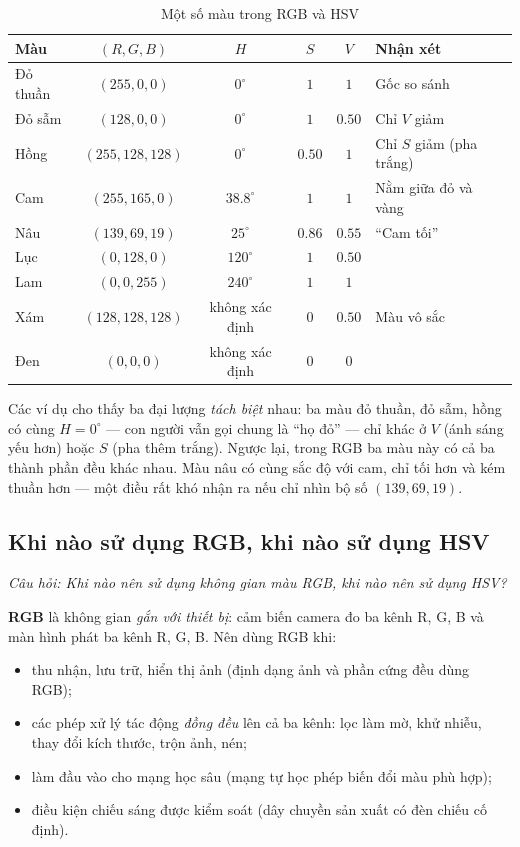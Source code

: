 \begin{table}[ht]
\centering
\small
\caption{Một số màu trong RGB và HSV}
\label{tab:w4_hsv_examples}
\renewcommand{\arraystretch}{1.25}
\begin{tabular}{|l|c|c|c|c|l|}
\hline
\textbf{Màu} & \textbf{$(R, G, B)$} & \textbf{$H$} & \textbf{$S$} & \textbf{$V$} & \textbf{Nhận xét} \\
\hline
Đỏ thuần & $(255, 0, 0)$ & $0^\circ$ & $1$ & $1$ & Gốc so sánh \\
Đỏ sẫm & $(128, 0, 0)$ & $0^\circ$ & $1$ & $0.50$ & Chỉ $V$ giảm \\
Hồng & $(255, 128, 128)$ & $0^\circ$ & $0.50$ & $1$ & Chỉ $S$ giảm (pha trắng) \\
Cam & $(255, 165, 0)$ & $38.8^\circ$ & $1$ & $1$ & Nằm giữa đỏ và vàng \\
Nâu & $(139, 69, 19)$ & $25^\circ$ & $0.86$ & $0.55$ & ``Cam tối'' \\
Lục & $(0, 128, 0)$ & $120^\circ$ & $1$ & $0.50$ & \\
Lam & $(0, 0, 255)$ & $240^\circ$ & $1$ & $1$ & \\
Xám & $(128, 128, 128)$ & không xác định & $0$ & $0.50$ & Màu vô sắc \\
Đen & $(0, 0, 0)$ & không xác định & $0$ & $0$ & \\
\hline
\end{tabular}
\end{table}

Các ví dụ cho thấy ba đại lượng \emph{tách biệt} nhau: ba màu đỏ thuần, đỏ sẫm, hồng có cùng $H = 0^\circ$ — con người vẫn gọi chung là ``họ đỏ'' — chỉ khác ở $V$ (ánh sáng yếu hơn) hoặc $S$ (pha thêm trắng). Ngược lại, trong RGB ba màu này có cả ba thành phần đều khác nhau. Màu nâu có cùng sắc độ với cam, chỉ tối hơn và kém thuần hơn — một điều rất khó nhận ra nếu chỉ nhìn bộ số $(139, 69, 19)$.

\subsection{Khi nào sử dụng RGB, khi nào sử dụng HSV}
\label{subsec:w4_rgb_vs_hsv}

\textit{Câu hỏi: Khi nào nên sử dụng không gian màu RGB, khi nào nên sử dụng HSV?}

\textbf{RGB} là không gian \emph{gắn với thiết bị}: cảm biến camera đo ba kênh R, G, B và màn hình phát ba kênh R, G, B. Nên dùng RGB khi:
\begin{itemize}
    \item thu nhận, lưu trữ, hiển thị ảnh (định dạng ảnh và phần cứng đều dùng RGB);
    \item các phép xử lý tác động \emph{đồng đều} lên cả ba kênh: lọc làm mờ, khử nhiễu, thay đổi kích thước, trộn ảnh, nén;
    \item làm đầu vào cho mạng học sâu (mạng tự học phép biến đổi màu phù hợp);
    \item điều kiện chiếu sáng được kiểm soát (dây chuyền sản xuất có đèn chiếu cố định).
\end{itemize}

